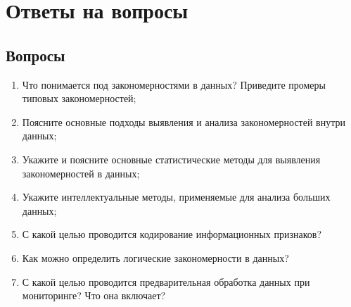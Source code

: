 \documentclass[a4paper, 12pt]{article}
\begin{document}
\section{Ответы на вопросы}
\subsection*{Вопросы}
\begin{enumerate}
  \item Что понимается под закономерностями в данных? Приведите промеры типовых закономерностей;
  \item Поясните основные подходы выявления и анализа закономерностей внутри данных;
  \item Укажите и поясните основные статистические методы для выявления закономерностей в данных;
  \item Укажите интеллектуальные методы, применяемые для анализа больших данных;
  \item С какой целью проводится кодирование информационных признаков?
  \item Как можно определить логические закономерности в данных?
  \item С какой целью проводится предварительная обработка данных при мониторинге? Что она включает?
\end{enumerate}
\end{document}
